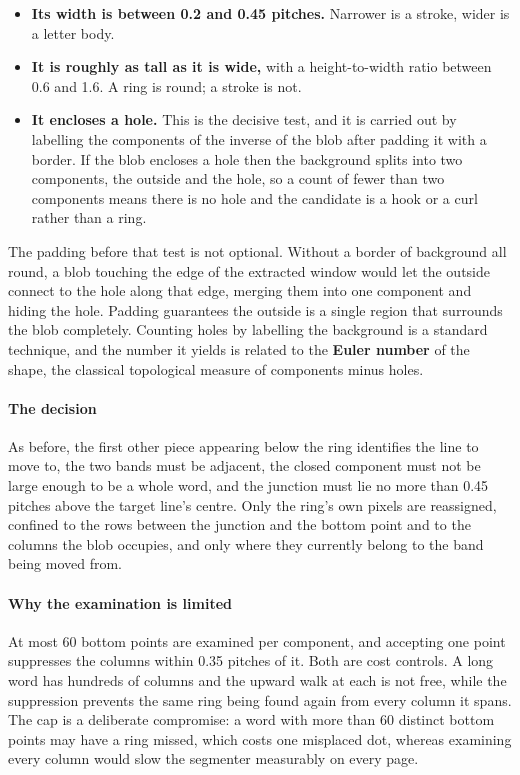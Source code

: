 \begin{itemize}\setlength\itemsep{0pt}
  \item \textbf{Its width is between 0.2 and 0.45 pitches.} Narrower is a stroke, wider is a letter body.
  \item \textbf{It is roughly as tall as it is wide,} with a height-to-width ratio between 0.6 and 1.6. A ring is round; a stroke is not.
  \item \textbf{It encloses a hole.} This is the decisive test, and it is carried out by labelling the components of the inverse of the blob after padding it with a border. If the blob encloses a hole then the background splits into two components, the outside and the hole, so a count of fewer than two components means there is no hole and the candidate is a hook or a curl rather than a ring.
\end{itemize}
The padding before that test is not optional. Without a border of background all round, a blob touching the edge of the extracted window would let the outside connect to the hole along that edge, merging them into one component and hiding the hole. Padding guarantees the outside is a single region that surrounds the blob completely. Counting holes by labelling the background is a standard technique, and the number it yields is related to the \textbf{Euler number} of the shape, the classical topological measure of components minus holes.


\paragraph{The decision}
As before, the first other piece appearing below the ring identifies the line to move to, the two bands must be adjacent, the closed component must not be large enough to be a whole word, and the junction must lie no more than 0.45 pitches above the target line's centre. Only the ring's own pixels are reassigned, confined to the rows between the junction and the bottom point and to the columns the blob occupies, and only where they currently belong to the band being moved from.


\paragraph{Why the examination is limited}
At most 60 bottom points are examined per component, and accepting one point suppresses the columns within 0.35 pitches of it. Both are cost controls. A long word has hundreds of columns and the upward walk at each is not free, while the suppression prevents the same ring being found again from every column it spans. The cap is a deliberate compromise: a word with more than 60 distinct bottom points may have a ring missed, which costs one misplaced dot, whereas examining every column would slow the segmenter measurably on every page.


